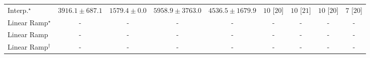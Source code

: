 \begin{tabular}{l|cccc|cccc|}
Interp.$^\star$ & {\cellcolor[HTML]{B9C6E0}} \color[HTML]{000000} $3916.1\pm 687.1$ & {\cellcolor[HTML]{FFF7FB}} \color[HTML]{000000} $1579.4\pm 0.0$ & {\cellcolor[HTML]{4697C4}} \color[HTML]{F1F1F1} $5958.9\pm 3763.0$ & {\cellcolor[HTML]{9CB9D9}} \color[HTML]{000000} $4536.5\pm 1679.9$ & {\cellcolor[HTML]{49006A}} \color[HTML]{F1F1F1} $10$ [$20$] & {\cellcolor[HTML]{49006A}} \color[HTML]{F1F1F1} $10$ [$21$] & {\cellcolor[HTML]{49006A}} \color[HTML]{F1F1F1} $10$ [$20$] & {\cellcolor[HTML]{CD238F}} \color[HTML]{F1F1F1} $7$ [$20$] \\
Linear Ramp$^\star$ & {\cellcolor[HTML]{000000}} \color[HTML]{F1F1F1} {\cellcolor{white}} \color{black} - & {\cellcolor[HTML]{000000}} \color[HTML]{F1F1F1} {\cellcolor{white}} \color{black} - & {\cellcolor[HTML]{000000}} \color[HTML]{F1F1F1} {\cellcolor{white}} \color{black} - & {\cellcolor[HTML]{000000}} \color[HTML]{F1F1F1} {\cellcolor{white}} \color{black} - & {\cellcolor[HTML]{000000}} \color[HTML]{F1F1F1} {\cellcolor{white}} \color{black} - & {\cellcolor[HTML]{000000}} \color[HTML]{F1F1F1} {\cellcolor{white}} \color{black} - & {\cellcolor[HTML]{000000}} \color[HTML]{F1F1F1} {\cellcolor{white}} \color{black} - & {\cellcolor[HTML]{000000}} \color[HTML]{F1F1F1} {\cellcolor{white}} \color{black} - \\
Linear Ramp & {\cellcolor[HTML]{000000}} \color[HTML]{F1F1F1} {\cellcolor{white}} \color{black} - & {\cellcolor[HTML]{000000}} \color[HTML]{F1F1F1} {\cellcolor{white}} \color{black} - & {\cellcolor[HTML]{000000}} \color[HTML]{F1F1F1} {\cellcolor{white}} \color{black} - & {\cellcolor[HTML]{000000}} \color[HTML]{F1F1F1} {\cellcolor{white}} \color{black} - & {\cellcolor[HTML]{000000}} \color[HTML]{F1F1F1} {\cellcolor{white}} \color{black} - & {\cellcolor[HTML]{000000}} \color[HTML]{F1F1F1} {\cellcolor{white}} \color{black} - & {\cellcolor[HTML]{000000}} \color[HTML]{F1F1F1} {\cellcolor{white}} \color{black} - & {\cellcolor[HTML]{000000}} \color[HTML]{F1F1F1} {\cellcolor{white}} \color{black} - \\
Linear Ramp$^\dagger$ & {\cellcolor[HTML]{000000}} \color[HTML]{F1F1F1} {\cellcolor{white}} \color{black} - & {\cellcolor[HTML]{000000}} \color[HTML]{F1F1F1} {\cellcolor{white}} \color{black} - & {\cellcolor[HTML]{000000}} \color[HTML]{F1F1F1} {\cellcolor{white}} \color{black} - & {\cellcolor[HTML]{000000}} \color[HTML]{F1F1F1} {\cellcolor{white}} \color{black} - & {\cellcolor[HTML]{000000}} \color[HTML]{F1F1F1} {\cellcolor{white}} \color{black} - & {\cellcolor[HTML]{000000}} \color[HTML]{F1F1F1} {\cellcolor{white}} \color{black} - & {\cellcolor[HTML]{000000}} \color[HTML]{F1F1F1} {\cellcolor{white}} \color{black} - & {\cellcolor[HTML]{000000}} \color[HTML]{F1F1F1} {\cellcolor{white}} \color{black} - \\

\end{tabular}
